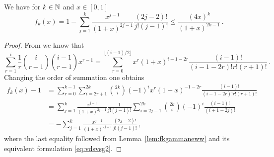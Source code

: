 \begin{lemma}\label{lem:fkgamma}
We have for $k\in \mathbb{N}$ and $x\in [0,1]$
\begin{equation*}
f_k(x) = 1 - \sum_{j=1}^k \frac{x^{j-1}}{(1+x)^{2j-1}} \frac{(2j-2)!}{j! (j-1)!} \le \frac{ (4x)^k}{(1+x)^{2k-1}}\,.
\end{equation*}
\end{lemma}
\begin{proof}
From \cite[page 41]{bai:silverstein:2010} we know that 
\begin{equation*}
\sum_{r=1}^i \frac{1}{r} \binom{i}{r-1} \binom{i-1}{r-1} x^{r-1}
= \sum_{r=0}^{\lfloor(i-1)/2 \rfloor} x^r (1+x)^{i-1-2r} \frac{(i-1)!}{(i-1-2r)! r! (r+1)!}\,.
\end{equation*}
Changing the order of summation one obtains
\begin{equation*}
\begin{split}
f_k(x)-1&= \sum_{r=0}^{k-1} \sum_{i=2r+1}^{2k} \binom{2k}{i} (-1)^i x^r (1+x)^{-1-2r}\frac{(i-1)!}{(i-1-2r)! r! (r+1)!}\\
&= \sum_{j=1}^k \frac{x^{j-1}}{(1+x)^{2j-1}} \frac{1}{j! (j-1)!} \sum_{i=2j-1}^{2k} \binom{2k}{i} (-1)^i \frac{(i-1)!}{(i+1-2j)!}\\
&= -\sum_{j=1}^k \frac{x^{j-1}}{(1+x)^{2j-1}} \frac{(2j-2)!}{j! (j-1)!}\,,
\end{split}
\end{equation*}
where the last equality followed from Lemma~\ref{lem:fkgammaneww} and its equivalent formulation \eqref{eq:vdsvsg2}.


\end{proof}
